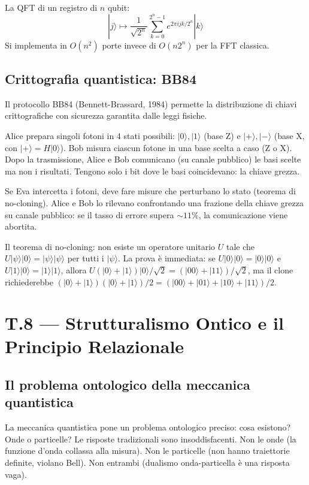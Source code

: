 \documentclass[11.5pt,a4paper,openany]{book}
\theoremstyle{remark}
\begin{document}
La QFT di un registro di $n$ qubit:
\[
|j\rangle \mapsto \frac{1}{\sqrt{2^n}}\sum_{k=0}^{2^n-1} e^{2\pi ijk/2^n}|k\rangle
\]
Si implementa in $O(n^2)$ porte invece di $O(n 2^n)$ per la FFT classica.

\section{Crittografia quantistica: BB84}

Il protocollo BB84 (Bennett-Brassard, 1984) permette la distribuzione di chiavi crittografiche con sicurezza garantita dalle leggi fisiche.

Alice prepara singoli fotoni in 4 stati possibili: $|0\rangle, |1\rangle$ (base Z) e $|+\rangle, |-\rangle$ (base X, con $|+\rangle = H|0\rangle$). Bob misura ciascun fotone in una base scelta a caso (Z o X). Dopo la trasmissione, Alice e Bob comunicano (su canale pubblico) le basi scelte ma non i risultati. Tengono solo i bit dove le basi coincidevano: la chiave grezza.

Se Eva intercetta i fotoni, deve fare misure che perturbano lo stato (teorema di no-cloning). Alice e Bob lo rilevano confrontando una frazione della chiave grezza su canale pubblico: se il tasso di errore supera $\sim 11\%$, la comunicazione viene abortita.

Il teorema di no-cloning: non esiste un operatore unitario $U$ tale che $U|\psi\rangle|0\rangle = |\psi\rangle|\psi\rangle$ per tutti i $|\psi\rangle$. La prova è immediata: se $U|0\rangle|0\rangle = |0\rangle|0\rangle$ e $U|1\rangle|0\rangle = |1\rangle|1\rangle$, allora $U(|0\rangle+|1\rangle)|0\rangle/\sqrt{2} = (|00\rangle + |11\rangle)/\sqrt{2}$, ma il clone richiederebbe $(|0\rangle + |1\rangle)(|0\rangle + |1\rangle)/2 = (|00\rangle + |01\rangle + |10\rangle + |11\rangle)/2$.

\chapter*{T.8 — Strutturalismo Ontico e il Principio Relazionale}

\section{Il problema ontologico della meccanica quantistica}

La meccanica quantistica pone un problema ontologico preciso: cosa esistono? Onde o particelle? Le risposte tradizionali sono insoddisfacenti. Non le onde (la funzione d'onda collassa alla misura). Non le particelle (non hanno traiettorie definite, violano Bell). Non entrambi (dualismo onda-particella è una risposta vaga).
\end{document}
